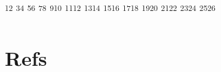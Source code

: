 \documentclass[
]{article}
\author{}
\date{}
\begin{document}
\textsuperscript{1}\textsuperscript{2}
\textsuperscript{3}\textsuperscript{4}
\textsuperscript{5}\textsuperscript{6}
\textsuperscript{7}\textsuperscript{8}
\textsuperscript{9}\textsuperscript{10}
\textsuperscript{11}\textsuperscript{12}
\textsuperscript{13}\textsuperscript{14}
\textsuperscript{15}\textsuperscript{16}
\textsuperscript{17}\textsuperscript{18}
\textsuperscript{19}\textsuperscript{20}
\textsuperscript{21}\textsuperscript{22}
\textsuperscript{23}\textsuperscript{24}
\textsuperscript{25}\textsuperscript{26}

\hypertarget{refs}{%
\section*{Refs}\label{refs}}

\hypertarget{refs}{}
\end{document}
